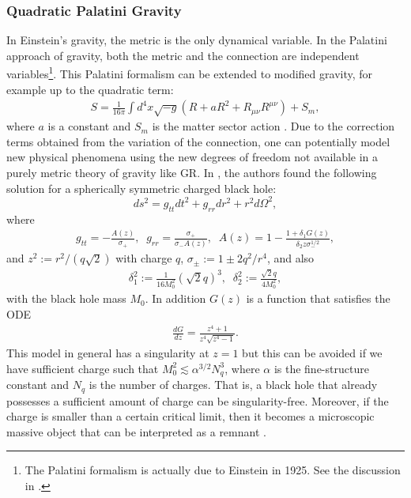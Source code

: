 \documentclass[12pt]{article}
\newcommand{\2}{$^2$}
\newcommand{\3}{$^3$}
\newcommand{\4}{$_4$}
\newcommand{\5}{$_5$}
\begin{document}
\subsubsection{Quadratic Palatini Gravity}

In Einstein's gravity, the metric is the only dynamical variable. In the Palatini approach \cite{Olmo:2011uz} of gravity, both the metric and the connection are independent variables\footnote{The Palatini formalism is actually due to Einstein in 1925. See the discussion in \cite{FFR}.}. This Palatini formalism can be extended to modified gravity, for example up to the quadratic term: 
\begin{eqnarray}
S = \frac{1}{16\pi }\int d^{4}x \sqrt{-g} \left( R + aR^{2} + R_{\mu\nu}R^{\mu\nu} \right) + S_{m}, 
\end{eqnarray}
where $a$ is a constant and $S_{m}$ is the matter sector action \cite{Olmo:2011np}. Due to the correction terms obtained from the variation of the connection, one can potentially model new physical phenomena using the new degrees of freedom not available in a purely metric theory of gravity like GR. In \cite{Olmo:2011np}, the authors found the following solution for a spherically symmetric charged black hole: 
\begin{equation}
 ds^{2} = g_{tt}dt^{2} + g_{rr}dr^{2}+r^{2}d\Omega^{2},
\end{equation}
where
\begin{eqnarray}
g_{tt} = - \frac{A(z)}{\sigma_{+}}, \;\; g_{rr} = \frac{\sigma_{+}}{\sigma_{-}A(z)}, \;\; A(z) = 1 - \frac{1+\delta_{1} G(z)}{\delta_{2} z \sigma_{-}^{1/2}},
\end{eqnarray}
and $z^{2} := r^{2}/(q\sqrt{2})$ with charge $q$, $\sigma_{\pm} := 1\pm 2q^{2}/r^{4}$, and also
\begin{eqnarray}
\delta_{1}^{2} := \frac{1}{16M_{0}^{2}} \left(\sqrt{2}q\right)^{3},\;\; \delta_{2}^{2} := \frac{\sqrt{2}q}{4M_{0}^{2}},
\end{eqnarray}
with the black hole mass $M_{0}$. In addition $G(z)$ is a function that satisfies the ODE
\begin{eqnarray}
\frac{dG}{dz} = \frac{z^{4} + 1}{z^{4} \sqrt{z^{4} - 1}}.
\end{eqnarray}
This model in general has a singularity at $z = 1$ but this can be avoided if we have sufficient charge such that $M_{0}^{2} \lesssim \alpha^{3/2} N_{q}^{3}$, where $\alpha$ is the fine-structure constant and $N_{q}$ is the number of charges. That is, a black hole that already possesses a sufficient amount of charge can be singularity-free. Moreover, if the charge is smaller than a certain critical limit, then it becomes a microscopic massive object that can be interpreted as a remnant \cite{1311.6487}.
\end{document}
